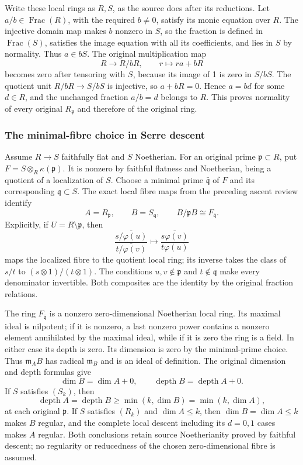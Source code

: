 Write these local rings as \(R,S\), as the source does after its reductions. Let \(a/b\in\operatorname{Frac}(R)\), with the required \(b\ne0\), satisfy its monic equation over \(R\). The injective domain map makes \(b\) nonzero in \(S\), so the fraction is defined in \(\operatorname{Frac}(S)\), satisfies the image equation with all its coefficients, and lies in \(S\) by normality. Thus \(a\in bS\). The original multiplication map \[
 R\longrightarrow R/bR,\qquad r\longmapsto ra+bR
\] becomes zero after tensoring with \(S\), because its image of 1 is zero in \(S/bS\). The quotient unit \(R/bR\to S/bS\) is injective, so \(a+bR=0\). Hence \(a=bd\) for some \(d\in R\), and the unchanged fraction \(a/b=d\) belongs to \(R\). This proves normality of every original \(R_{\mathfrak p}\) and therefore of the original ring.

\subsubsection{The minimal-fibre choice in Serre descent}\label{the-minimal-fibre-choice-in-serre-descent}

Assume \(R\to S\) faithfully flat and \(S\) Noetherian. For an original prime \(\mathfrak p\subset R\), put \(F=S\otimes_R\kappa(\mathfrak p)\). It is nonzero by faithful flatness and Noetherian, being a quotient of a localization of \(S\). Choose a minimal prime \(\bar{\mathfrak q}\) of \(F\) and its corresponding \(\mathfrak q\subset S\). The exact local fibre maps from the preceding ascent review identify \[
 A=R_{\mathfrak p},\qquad B=S_{\mathfrak q},\qquad
 B/\mathfrak pB\cong F_{\bar{\mathfrak q}}.
\] Explicitly, if \(U=R\setminus\mathfrak p\), then \[
 \frac{\overline{s/\varphi(u)}}{\overline{t/\varphi(v)}}
 \longmapsto\overline{\frac{s\varphi(v)}{t\varphi(u)}}
\] maps the localized fibre to the quotient local ring; its inverse takes the class of \(s/t\) to \((s\otimes1)/(t\otimes1)\). The conditions \(u,v\notin\mathfrak p\) and \(t\notin\mathfrak q\) make every denominator invertible. Both composites are the identity by the original fraction relations.

The ring \(F_{\bar{\mathfrak q}}\) is a nonzero zero-dimensional Noetherian local ring. Its maximal ideal is nilpotent; if it is nonzero, a last nonzero power contains a nonzero element annihilated by the maximal ideal, while if it is zero the ring is a field. In either case its depth is zero. Its dimension is zero by the minimal-prime choice. Thus \(\mathfrak m_AB\) has radical \(\mathfrak m_B\) and is an ideal of definition. The original dimension and depth formulas give \[
 \dim B=\dim A+0,\qquad
 \operatorname{depth}B=\operatorname{depth}A+0.
\] If \(S\) satisfies \((S_k)\), then \[
 \operatorname{depth}A=\operatorname{depth}B
 \ge\min(k,\dim B)=\min(k,\dim A),
\] at each original \(\mathfrak p\). If \(S\) satisfies \((R_k)\) and \(\dim A\le k\), then \(\dim B=\dim A\le k\) makes \(B\) regular, and the complete local descent including its \(d=0,1\) cases makes \(A\) regular. Both conclusions retain source Noetherianity proved by faithful descent; no regularity or reducedness of the chosen zero-dimensional fibre is assumed.

